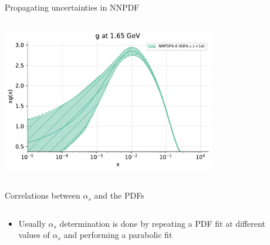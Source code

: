 \documentclass[aspectratio=169, 9pt,t]{beamer}
\begin{document}
\begin{frame}{Propagating uncertainties in NNPDF}
\begin{columns}
\begin{column}{0.49\textwidth}
\begin{center}
        \includegraphics[width=0.7\textwidth]{band_g.pdf}
      \end{center}
    \end{column}
  \end{columns}
\end{frame}




\begin{frame}{Correlations between $\alpha_s$ and the PDFs}
  \begin{columns}[T]
    \begin{column}{0.49\textwidth}
      \begin{itemize}
        \item Usually $\alpha_s$ determination is done by repeating a PDF fit at different values of $\alpha_s$ and performing a parabolic fit
      \end{itemize}
    \end{column}
    \begin{column}{0.49\textwidth}
    \end{column}
  \end{columns}
\end{frame}
\end{document}
